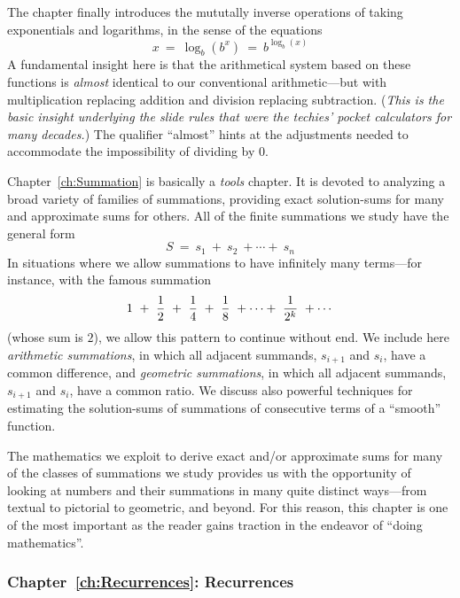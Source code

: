 The chapter finally introduces the mututally inverse operations of
taking exponentials and logarithms, in the sense of the equations
\[  x \ = \ \log_b(b^x) \ = \ b^{\log_b(x)} \]
A fundamental insight here is that the arithmetical system based on
these functions is {\em almost} identical to our conventional
arithmetic---but with multiplication replacing addition and division
replacing subtraction.  ({\em This is the basic insight underlying the
  {\em slide rules} that were the techies' pocket calculators for many
  decades.})  The qualifier ``almost'' hints at the adjustments needed
to accommodate the impossibility of dividing by $0$.

\bigskip

Chapter~\ref{ch:Summation} is basically a {\em tools} chapter.  It is
devoted to analyzing a broad variety of families of summations,
providing exact solution-sums for many and approximate sums for
others.  All of the finite summations we study have the general form
\[ S \ = \ s_1 \ + \ s_2 \ + \cdots + \ s_n \]
In situations where we allow summations to have infinitely many
terms---for instance, with the famous summation
\[ 1 \ + \ {1 \over 2} \ + \ {1 \over 4} \ + \ {1 \over 8} \ + \cdots
+ \ {1 \over {2^k}} \ + \cdots
\]
(whose sum is $2$), we allow this pattern to continue without end.  We
include here {\it arithmetic summations}, in which all adjacent
summands, $s_{i+1}$ and $s_i$, have a common difference, and {\it
  geometric summations}, in which all adjacent summands, $s_{i+1}$ and
$s_i$, have a common ratio.  We discuss also powerful techniques for
estimating the solution-sums of summations of consecutive terms of a
``smooth'' function.

The mathematics we exploit to derive exact and/or approximate sums for
many of the classes of summations we study provides us with the
opportunity of looking at numbers and their summations in many quite
distinct ways---from textual to pictorial to geometric, and beyond.
For this reason, this chapter is one of the most important as the
reader gains traction in the endeavor of ``doing mathematics''.


\subsubsection{Chapter~\ref{ch:Recurrences}: Recurrences}

